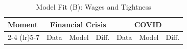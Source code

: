 \begin{table}[htbp]
  \centering
  \caption{Model Fit (B): Wages and Tightness}
  \label{tab:model_fit_b}
  \small
  \begin{tabular}{lrrrrrr}
    \toprule
    Moment & \multicolumn{3}{c}{Financial Crisis} & \multicolumn{3}{c}{COVID} \\
    \cmidrule(lr){2-4} \cmidrule(lr){5-7}
     & Data & Model & Diff. & Data & Model & Diff. \\
    \midrule
    \bottomrule
  \end{tabular}
\end{table}